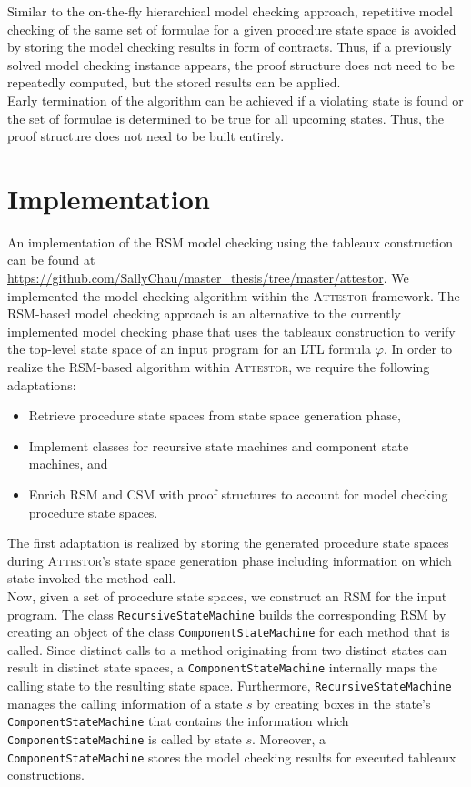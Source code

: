 \documentclass[a4paper, 12pt, twoside]{report}
\begin{document}
	Similar to the on-the-fly hierarchical model checking approach, repetitive model checking of the same set of formulae for a given procedure state space is avoided by storing the model checking results in form of contracts. Thus, if a previously solved model checking instance appears, the proof structure does not need to be repeatedly computed, but the stored results can be applied.\\
	
	Early termination of the algorithm can be achieved if a violating state is found or the set of formulae is determined to be true for all upcoming states. Thus, the proof structure does not need to be built entirely.
	
	\section{Implementation}
	
	An implementation of the RSM model checking using the tableaux construction can be found at \url{https://github.com/SallyChau/master_thesis/tree/master/attestor}. We implemented the model checking algorithm within the \textsc{Attestor} framework. The RSM-based model checking approach is an alternative to the currently implemented model checking phase that uses the tableaux construction to verify the top-level state space of an input program for an LTL formula $\varphi$. In order to realize the RSM-based algorithm within \textsc{Attestor}, we require the following adaptations:
	\begin{itemize}
		\item Retrieve procedure state spaces from state space generation phase,
		\item Implement classes for recursive state machines and component state machines, and
		\item Enrich RSM and CSM with proof structures to account for model checking procedure state spaces.
	\end{itemize}

	The first adaptation is realized by storing the generated procedure state spaces during \textsc{Attestor}'s state space generation phase including information on which state invoked the method call.\\
	
	Now, given a set of procedure state spaces, we construct an RSM for the input program. The class \texttt{RecursiveStateMachine} builds the corresponding RSM by creating an object of the class \texttt{ComponentStateMachine} for each method that is called. Since distinct calls to a method originating from two distinct states can result in distinct state spaces, a \texttt{ComponentStateMachine} internally maps the calling state to the resulting state space. Furthermore, \texttt{RecursiveStateMachine} manages the calling information of a state $s$ by creating boxes in the state's \texttt{ComponentStateMachine} that contains the information which \texttt{ComponentStateMachine} is called by state $s$. Moreover, a \texttt{ComponentStateMachine} stores the model checking results for executed tableaux constructions.\\
	
\end{document}
